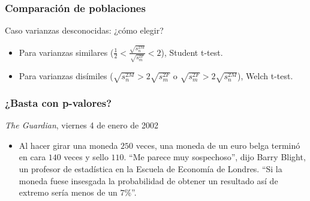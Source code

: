 \documentclass[table]{beamer}
\begin{document}
\begin{frame}
    \frametitle{Comparación de poblaciones}
    \begin{block}{Caso varianzas desconocidas: ¿cómo elegir?}
        \begin{itemize}
            \item Para varianzas similares ($\frac{1}{2} < \frac{\sqrt{s^{2 M}_{n}}}{\sqrt{s^{2 F}_{m}}} < 2$), Student t-test.
            \item Para varianzas disímiles ($\sqrt{s^{2 M}_{n}} > 2 \sqrt{s^{2 F}_{m}}$ o $\sqrt{s^{2 F}_{m}} > 2 \sqrt{s^{2 M}_{n}}$), Welch t-test.
        \end{itemize}
    \end{block}
\end{frame}

\begin{frame}
    \frametitle{¿Basta con p-valores?}
    \begin{block}{\emph{The Guardian}, viernes 4 de enero de 2002}
        \begin{itemize}
            \item Al hacer girar una moneda $250$ veces, una moneda de un euro belga terminó en cara $140$ veces y sello $110$. ``Me parece muy sospechoso'', dijo Barry Blight, un profesor de estadística en la Escuela de Economía de Londres. ``Si la moneda fuese insesgada la probabilidad de obtener un resultado así de extremo sería menos de un $7 \%$''.
        \end{itemize}
    \end{block}
\end{frame}
\end{document}
